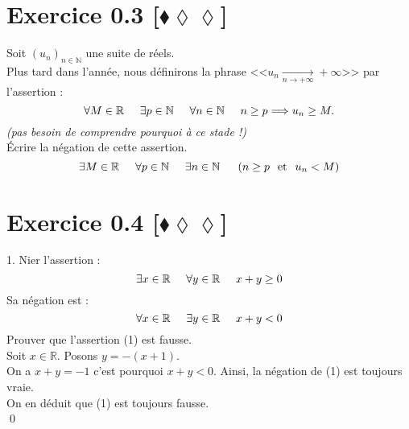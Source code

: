 \documentclass[10pt]{article}
\begin{document}
\section*{Exercice 0.3 [$\blacklozenge\lozenge\lozenge$]}
\begin{tcolorbox}[enhanced, width=7in, center, size=fbox, fontupper=\large, drop shadow southwest]
    Soit $(u_n)_{n\in\mathbb{N}}$ une suite de réels.\\
    Plus tard dans l'année, nous définirons la phrase <<$u_n\underset{n\rightarrow+\infty}{\longrightarrow}+\infty$>> par l'assertion :
    \begin{equation*}
        \forall M\in\mathbb{R}\hspace{0.5cm}\exists p\in\mathbb{N}\hspace{0.5cm} \forall{n}\in\mathbb{N}\hspace{0.5cm}n\geq p\Longrightarrow u_n\geq M.
    \end{equation*}
    \emph{(pas besoin de comprendre pourquoi à ce stade !)}\\
    Écrire la négation de cette assertion.
    \begin{equation*}
        \exists{M\in\mathbb{R}}\hspace{0.5cm}\forall{p\in\mathbb{N}}\hspace{0.5cm}\exists{n\in\mathbb{N}}\hspace{0.5cm}\left(n\geq{p}\hspace{0.25cm}\text{et}\hspace{0.25cm}u_n<M\right)
    \end{equation*}
\end{tcolorbox}

\section*{Exercice 0.4 [$\blacklozenge\lozenge\lozenge$]}
\begin{tcolorbox}[enhanced, width=7in, center, size=fbox, fontupper=\large, drop shadow southwest]
    1. Nier l'assertion :
    \begin{equation}
        \exists{x\in\mathbb{R}}\hspace{0.5cm}\forall{y\in\mathbb{R}}\hspace{0.5cm}x+y\geq0
    \end{equation}
    Sa négation est :
    \begin{equation*}
        \forall{x\in\mathbb{R}}\hspace{0.5cm}\exists{y\in\mathbb{R}}\hspace{0.5cm}x+y<0
    \end{equation*}
    Prouver que l'assertion (1) est fausse.\\
    Soit $x\in\mathbb{R}$. Posons $y=-(x+1)$.\\
    On a $x+y=-1$ c'est pourquoi $x+y<0$. Ainsi, la négation de (1) est toujours vraie.\\
    On en déduit que (1) est toujours fausse.\\
    \qed
\end{tcolorbox}
\end{document}
